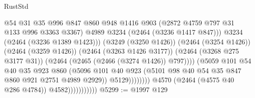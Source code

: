 \begin{lexlean}{RustStd}
\begin{coremodule}
                                                @54
                                                @31
                                                @35
                                                @996
                                                @847
                                                @860
                                                @948
                                                @1416
                                                @903
                                                (@2872 @4759 @797 @31 @133 @996 @3363 @3367)
                                                @4989
                                                @3234
                                                (@2464 (@3236 @1417 @847)))
                                              @3234
                                              (@2464 (@3236 @1389 @1423)))
                                            (@3249 (@3250 @1426))
                                            (@2464 (@3254 @1426))
                                            (@2464 (@3259 @1426))
                                            (@2464 (@3263 @1426 @3177))
                                            (@2464 (@3268 @275 @3177 @31))
                                            (@2464 (@2465 (@2466 (@3274 @1426)) @797))))
                                        (@5059
                                          @101
                                          @54
                                          @40
                                          @35
                                          @923
                                          @860
                                          (@5096
                                            @101
                                            @40
                                            @923
                                            (@5101
                                              @98
                                              @40
                                              @54
                                              @35
                                              @847
                                              @860
                                              @921
                                              @2751
                                              @4989
                                              @2929))
                                          @5129))))))))
                          @4570
                          (@2464 (@4575 @40 @286 @4784))
                          @4582)))))))))))
@5299 := @1997 @129

\end{coremodule}
\end{lexlean}
